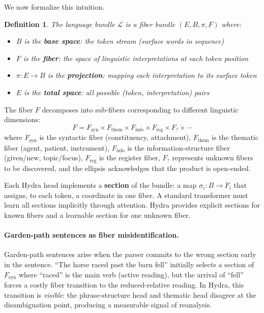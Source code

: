 \documentclass[11pt]{article}
\newtheorem{definition}{Definition}
\begin{document}
We now formalize this intuition.

\begin{definition}
The \emph{language bundle} $\mathcal{L}$ is a fiber bundle $(E, B, \pi, F)$ where:
\begin{itemize}
    \item $B$ is the \textbf{base space}: the token stream (surface words in sequence)
    \item $F$ is the \textbf{fiber}: the space of linguistic interpretations at each token position
    \item $\pi: E \to B$ is the \textbf{projection}: mapping each interpretation to its surface token
    \item $E$ is the \textbf{total space}: all possible (token, interpretation) pairs
\end{itemize}
\end{definition}

The fiber $F$ decomposes into sub-fibers corresponding to different linguistic 
dimensions:
\begin{equation}
F = F_{\text{syn}} \times F_{\text{them}} \times F_{\text{info}} \times F_{\text{reg}} \times F_{\text{?}} \times \cdots
\end{equation}
where $F_{\text{syn}}$ is the syntactic fiber (constituency, attachment), 
$F_{\text{them}}$ is the thematic fiber (agent, patient, instrument), 
$F_{\text{info}}$ is the information-structure fiber (given/new, topic/focus), 
$F_{\text{reg}}$ is the register fiber, $F_{\text{?}}$ represents unknown 
fibers to be discovered, and the ellipsis acknowledges that the product is 
open-ended.

Each Hydra head implements a \textbf{section} of the bundle: a map 
$\sigma_i: B \to F_i$ that assigns, to each token, a coordinate in one fiber. 
A standard transformer must learn all sections implicitly through attention. 
Hydra provides explicit sections for known fibers and a learnable section 
for one unknown fiber.

\paragraph{Garden-path sentences as fiber misidentification.}
Garden-path sentences arise when the parser commits to the wrong section 
early in the sentence. ``The horse raced past the barn fell'' initially 
selects a section of $F_{\text{syn}}$ where ``raced'' is the main verb 
(active reading), but the arrival of ``fell'' forces a costly fiber 
transition to the reduced-relative reading. In Hydra, this transition is 
\emph{visible}: the phrase-structure head and thematic head disagree at 
the disambiguation point, producing a measurable signal of reanalysis.
\end{document}
